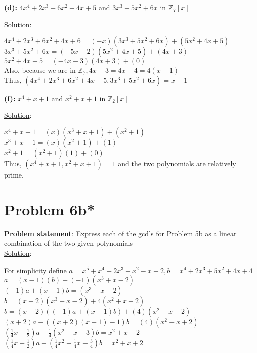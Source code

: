 \documentclass{article} %
\begin{document}
\textbf{(d): }$4x^4 + 2x^3 + 6x^2 + 4x + 5$ and $3x^3 + 5x^2 + 6x$ in $\mathbb{Z}_7[x]$
\begin{addmargin}[1em]{0em}
\underline{Solution}: 
\begin{addmargin}[1em]{0em}
$4x^4 + 2x^3 + 6x^2 + 4x + 6 = (-x)(3x^3 + 5x^2 + 6x) + (5x^2 + 4x + 5)$
\\$3x^3 + 5x^2 + 6x = (-5x - 2)(5x^2 + 4x + 5) + (4x + 3)$
\\$5x^2 + 4x + 5 = (-4x - 3)(4x + 3) + (0)$
\\Also, because we are in $\mathbb{Z}_7, 4x + 3 = 4x - 4 = 4(x-1)$
\\Thus, $(4x^4 + 2x^3 + 6x^2 + 4x + 5, 3x^3 + 5x^2 + 6x) = x-1$
\end{addmargin}
\end{addmargin}
\textbf{(f): }$x^4 + x + 1$ and $x^2 + x + 1$ in $\mathbb{Z}_2[x]$
\begin{addmargin}[1em]{0em}
\underline{Solution}: 
\begin{addmargin}[1em]{0em}
$x^4 + x + 1 = (x)(x^3 + x + 1) + (x^2 + 1)$
\\$x^3 + x + 1 = (x)(x^2 + 1) + (1)$
\\$x^2 + 1 = (x^2 + 1)(1) + (0)$
\\Thus, $(x^4 + x + 1, x^2 + x + 1) = 1$ and the two polynomials are relatively prime.
\end{addmargin}
\end{addmargin}
\newpage
\section*{Problem 6b*}
\textbf{Problem statement}: Express each of the gcd's for Problem 5b as a linear combination of the two given polynomials
\\

\underline{Solution}: 
\begin{addmargin}[1em]{0em}
For simplicity define $a = x^5 + x^4 + 2x^3 -x^2 -x - 2, b = x^4 + 2x^3 + 5x^2 + 4x + 4$
\\$a = (x-1)(b) + (-1)(x^3 + x - 2)$
\\$(-1)a + (x-1)b = (x^3 + x - 2)$
\\$b = (x + 2)(x^3 + x - 2) + 4(x^2 + x + 2)$
\\$b = (x + 2)((-1)a + (x-1)b) + (4)(x^2 + x + 2)$
\\$(x+2)a - ((x+2)(x-1) - 1)b = (4)(x^2 + x + 2)$
\\$(\frac{1}{4}x + \frac{1}{2})a - \frac{1}{4}(x^2 + x - 3)b = x^2 + x + 2$
\\$(\frac{1}{4}x + \frac{1}{2})a - (\frac{1}{4}x^2 + \frac{1}{4}x - \frac{3}{4})b = x^2 + x + 2$
\end{addmargin}
\newpage
\end{document}
